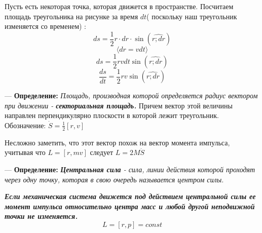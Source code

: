 \documentclass[12pt,a4paper]{report}
\begin{document}
\begin{center}
\end{center}
Пусть есть некоторая точка, которая движется в пространстве. Посчитаем площадь треугольника на рисунке за время $dt$( поскольку наш треугольник изменяется со временем) :
\[ ds  = \frac{1}{2}r \cdot dr \cdot \sin{(\hat{r;dr})} \]
\[ \langle  dr = vdt \rangle \]
\[ ds = \frac{1}{2} rvdt \sin{(\hat{r;dr})} \]
\[\frac{ds}{dt} = \frac{1}{2} rv \sin{(\hat{r;dr})}\]

--- \textbf{Определение:} \textit{Площадь, производная которой определяется радиус вектором при движении - \textbf{секториальная площадь.}} Причем вектор этой величины направлен перпендикулярно плоскости в которой лежит треугольник. Обозначение: $ \dot S = \frac{1}{2}[r,v]$

\vspace{5px}

Несложно заметить, что этот вектор похож на вектор момента импульса, учитывая что $L = [r, mv]$ следует $L = 2M \dot S$

\vspace{5px}

--- \textbf{Определение:} \textit{\textbf{Центральная сила} - сила, линии действия которой проходят через одну точку, которая в свою очередь называется центром силы.}

\vspace{5px}

\textbf{\textit{Если механическая система движется под действием центральной силы ее момент импульса относительно центра масс и любой другой неподвижной точки не изменяется.}}
\[L = [r, p] = const\]
\end{document}
